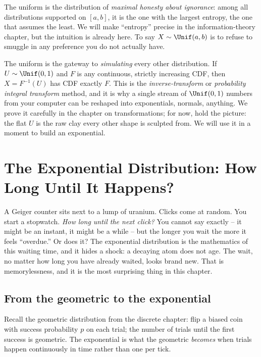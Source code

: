 \begin{aestheticbox}
The uniform is the distribution of \emph{maximal honesty about ignorance}: among
all distributions supported on $[a,b]$, it is the one with the largest entropy,
the one that assumes the least. We will make ``entropy'' precise in the
information-theory chapter, but the intuition is already here. To say
$X\sim\Unif(a,b)$ is to refuse to smuggle in any preference you do not actually
have.
\end{aestheticbox}

\begin{connectionbox}
The uniform is the gateway to \emph{simulating} every other distribution. If
$U\sim\Unif(0,1)$ and $F$ is any continuous, strictly increasing CDF, then
$X = F^{-1}(U)$ has CDF exactly $F$. This is the \emph{inverse-transform} or
\emph{probability integral transform} method, and it is why a single stream of
$\Unif(0,1)$ numbers from your computer can be reshaped into exponentials,
normals, anything. We prove it carefully in the chapter on transformations; for
now, hold the picture: the flat $U$ is the raw clay every other shape is
sculpted from. We will use it in a moment to build an exponential.
\end{connectionbox}

\section{The Exponential Distribution: How Long Until It Happens?}
\label{ch11:exponential}

\begin{intuitionbox}
A Geiger counter sits next to a lump of uranium. Clicks come at random. You
start a stopwatch. \emph{How long until the next click?} You cannot say exactly
-- it might be an instant, it might be a while -- but the longer you wait the
more it feels ``overdue.'' Or does it? The exponential distribution is the
mathematics of this waiting time, and it hides a shock: a decaying atom does not
age. The wait, no matter how long you have already waited, looks brand new. That
is memorylessness, and it is the most surprising thing in this chapter.
\end{intuitionbox}

\subsection{From the geometric to the exponential}

Recall the geometric distribution from the discrete chapter: flip a biased coin
with success probability $p$ on each trial; the number of trials until the first
success is geometric. The exponential is what the geometric \emph{becomes} when
trials happen continuously in time rather than one per tick.

